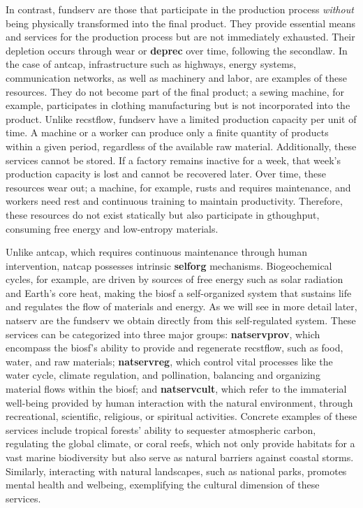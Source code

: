 \documentclass[./main_en.tex]{subfiles}
\begin{document}
\par In contrast, \gls{fundserv} are those that participate in the production process \textit{without} being physically transformed into the final product. They provide essential means and services for the production process but are not immediately exhausted. Their depletion occurs through wear or \textbf{\gls{deprec}} over time, following the \gls{secondlaw}. In the case of \gls{antcap}, infrastructure such as highways, energy systems, communication networks, as well as machinery and labor, are examples of these resources. They do not become part of the final product; a sewing machine, for example, participates in clothing manufacturing but is not incorporated into the product. Unlike \gls{recstflow}, \gls{fundserv} have a limited production capacity per unit of time. A machine or a worker can produce only a finite quantity of products within a given period, regardless of the available raw material. Additionally, these services cannot be stored. If a factory remains inactive for a week, that week's production capacity is lost and cannot be recovered later. Over time, these resources wear out; a machine, for example, rusts and requires maintenance, and workers need rest and continuous training to maintain productivity. Therefore, these resources do not exist statically but also participate in \gls{gthoughput}, consuming free energy and low-entropy materials.

\par Unlike \gls{antcap}, which requires continuous maintenance through human intervention, \gls{natcap} possesses intrinsic \textbf{\gls{selforg}} mechanisms. Biogeochemical cycles, for example, are driven by sources of free energy such as solar radiation and Earth's core heat, making the \gls{biosf} a self-organized \gls{system} that sustains life and regulates the flow of materials and energy. As we will see in more detail later, \gls{natserv} are the \gls{fundserv} we obtain directly from this self-regulated \gls{system}. These services can be categorized into three major groups: \textbf{\gls{natservprov}}, which encompass the \gls{biosf}'s ability to provide and regenerate \gls{recstflow}, such as food, water, and raw materials; \textbf{\gls{natservreg}}, which control vital processes like the water cycle, climate regulation, and pollination, balancing and organizing material flows within the \gls{biosf}; and \textbf{\gls{natservcult}}, which refer to the immaterial well-being provided by human interaction with the natural environment, through recreational, scientific, religious, or spiritual activities. Concrete examples of these services include tropical forests' ability to sequester atmospheric carbon, regulating the global climate, or coral reefs, which not only provide habitats for a vast marine biodiversity but also serve as natural barriers against coastal storms. Similarly, interacting with natural landscapes, such as national parks, promotes mental health and \gls{welbeing}, exemplifying the cultural dimension of these services.
\end{document}
